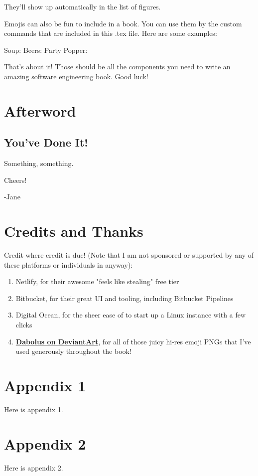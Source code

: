 \documentclass[a4paper,headinclude=on,footinclude=on,12pt,oneside]{scrbook}
\newcommand{\link}[2]{\textbf{\textcolor{monokaiPink}{\href{#2}{#1}}}}
\begin{document}
They'll show up automatically in the list of figures.


Emojis can also be fun to include in a book. You can use them by the custom commands that are included in this .tex file. Here are some examples:

Soup: \soup
Beers: \beers
Party Popper: \partypopper

That's about it! Those should be all the components you need to write an amazing software engineering book. Good luck!

\chapter*{Afterword}

\section*{You've Done It!}

Something, something.

Cheers! \beers

-Jane

\chapter*{Credits and Thanks}

Credit where credit is due! (Note that I am not sponsored or supported by any of these platforms or individuals in anyway):

\begin{enumerate}
\item Netlify, for their awesome "feels like stealing" free tier
\item Bitbucket, for their great UI and tooling, including Bitbucket Pipelines
\item Digital Ocean, for the sheer ease of to start up a Linux instance with a few clicks
\item \link{Dabolus on DeviantArt}{https://www.deviantart.com/dabolus}, for all of those juicy hi-res emoji PNGs that I've used generously throughout the book!
\end{enumerate}

\begin{appendices}

\chapter{Appendix 1}

Here is appendix 1.

\chapter{Appendix 2}

Here is appendix 2.

\end{appendices}
\end{document}
